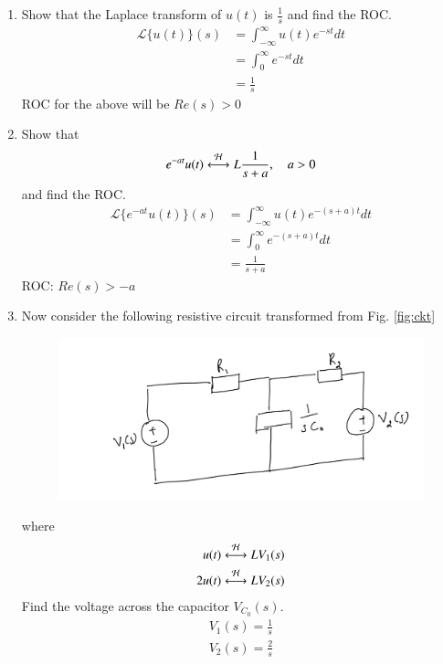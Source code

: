 \documentclass[journal,12pt,twocolumn]{IEEEtran}
\renewcommand\thesection{\arabic{section}}
\begin{document}
\begin{enumerate}[label=\arabic*.,ref=\thesection.\theenumi]
\item Show that the Laplace transform of $u(t)$ is $\frac{1}{s}$ and find the ROC.\\
\solution \begin{align}
    \mathcal{L}\{u(t)\}(s) &= \int_{-\infty}^{\infty} u(t)e^{-st}dt\\
    &= \int_{0}^{\infty}e^{-st}dt\\
    &=\frac{1}{s}
\end{align}
ROC for the above will be $Re(s)>0$
\item Show that 
	\begin{align}
		e^{-at}u(t) \overset{\mathcal{H}}{ \longleftrightarrow}{L} \frac{1}{s+a}, \quad a > 0
	\end{align}
	and find the ROC.\\
	\solution \begin{align}
	        \mathcal{L}\{e^{-at}u(t)\}(s) &= \int_{-\infty}^{\infty} u(t)e^{-(s+a)t}dt\\
    &= \int_{0}^{\infty}e^{-(s+a)t}dt\\
    &=\frac{1}{s+a}
	\end{align}
	ROC: $Re(s)>-a$
\item Now consider the following resistive circuit transformed from 
		Fig. \ref{fig:ckt}
	\begin{figure}[!ht]
		\centering
		\includegraphics[width=\columnwidth]{figs/lap-ckt.jpg}
		\caption{}
		\label{fig:lap-ckt}
\end{figure}
	where 
	\begin{align}
		u(t) \overset{\mathcal{H}}{ \longleftrightarrow}{L} V_1(s)
		\\
		2u(t) \overset{\mathcal{H}}{ \longleftrightarrow}{L} V_2(s)
	\end{align}
	Find the voltage across the capacitor $V_{C_0}(s)$.\\
	\solution \begin{align}
	    V_1(s) = \frac{1}{s}\\
	    V_2(s) = \frac{2}{s}
	\end{align}

\end{enumerate}
\end{document}
